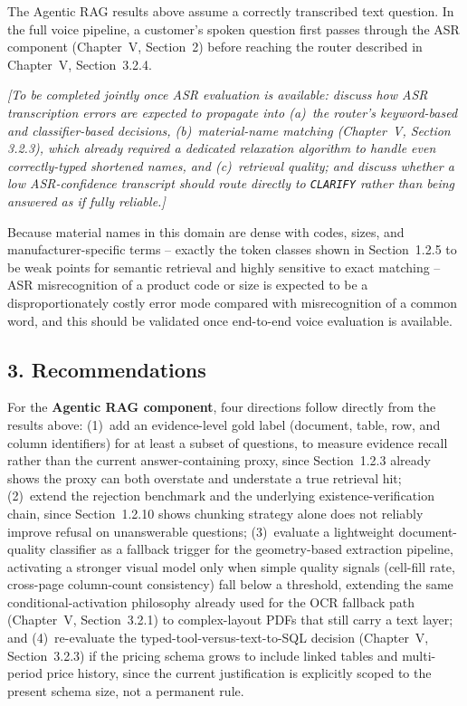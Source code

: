 \documentclass[11pt,a4paper]{article}
\newcommand{\guidance}[1]{%
  {\color{guidanceblue}\itshape [#1]\par}%
}
\begin{document}
The Agentic RAG results above assume a correctly transcribed text question.
In the full voice pipeline, a customer's spoken question first passes
through the ASR component (Chapter~V, Section~2) before reaching the router
described in Chapter~V, Section~3.2.4. \guidance{To be completed jointly
once ASR evaluation is available: discuss how ASR transcription errors are
expected to propagate into (a)~the router's keyword-based and
classifier-based decisions, (b)~material-name matching (Chapter~V, Section
3.2.3), which already required a dedicated relaxation algorithm to handle
even correctly-typed shortened names, and (c)~retrieval quality; and discuss
whether a low ASR-confidence transcript should route directly to
\texttt{CLARIFY} rather than being answered as if fully reliable.} Because
material names in this domain are dense with codes, sizes, and
manufacturer-specific terms -- exactly the token classes shown in Section~1.2.5
to be weak points for semantic retrieval and highly sensitive to exact
matching -- ASR misrecognition of a product code or size is expected to be a
disproportionately costly error mode compared with misrecognition of a
common word, and this should be validated once end-to-end voice evaluation
is available.

\subsection{3. Recommendations}

For the \textbf{Agentic RAG component}, four directions follow directly from
the results above: (1)~add an evidence-level gold label (document, table,
row, and column identifiers) for at least a subset of questions, to measure
evidence recall rather than the current answer-containing proxy, since
Section~1.2.3 already shows the proxy can both overstate and understate a
true retrieval hit; (2)~extend the rejection benchmark and the underlying
existence-verification chain, since Section~1.2.10 shows chunking strategy
alone does not reliably improve refusal on unanswerable questions;
(3)~evaluate a lightweight document-quality classifier as a fallback
trigger for the geometry-based extraction pipeline, activating a stronger
visual model only when simple quality signals (cell-fill rate, cross-page
column-count consistency) fall below a threshold, extending the same
conditional-activation philosophy already used for the OCR fallback path
(Chapter~V, Section~3.2.1) to complex-layout PDFs that still carry a text
layer; and (4)~re-evaluate the typed-tool-versus-text-to-SQL decision
(Chapter~V, Section~3.2.3) if the pricing schema grows to include linked
tables and multi-period price history, since the current justification is
explicitly scoped to the present schema size, not a permanent rule.
\end{document}
